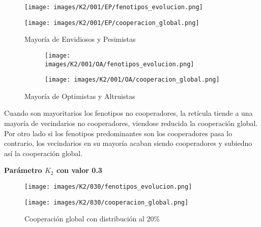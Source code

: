 \documentclass[a4paper,12pt]{report}
\begin{document}
\begin{figure}[h]
    \centering
    \begin{minipage}{0.49\textwidth}
    \centering
    \texttt{[image: images/K2/001/EP/fenotipos\_evolucion.png]}
    \label{fig:enter-label}
    \end{minipage}
    \hfill
    \begin{minipage}{0.49\textwidth}
    \centering
    \texttt{[image: images/K2/001/EP/cooperacion\_global.png]}
    \label{fig:enter-label}
    \end{minipage}
    \caption{Mayoría de Envidiosos y Pesimistas}
\end{figure}
\begin{figure}[h]
    \centering
    \begin{subfigure}[t]{0.49\textwidth}
        \centering
        \texttt{[image: images/K2/001/OA/fenotipos\_evolucion.png]}
        \label{fig:enter-label}
    \end{subfigure}
    \hfill
    \begin{subfigure}[t]{0.49\textwidth}
        \centering
        \texttt{[image: images/K2/001/OA/cooperacion\_global.png]}
        \label{fig:enter-label}
    \end{subfigure}
    \caption{Mayoría de Optimistas y Altruistas}
\end{figure}

\newpage
Cuando son mayoritarios los fenotipos no cooperadores, la retícula tiende a una mayoría de vecindarios no cooperadores, viendose reducida la cooperación global. Por otro lado si los fenotipos predominantes son los cooperadores pasa lo contrario, los vecindarios en su mayoría acaban siendo cooperadores y subiedno así la cooperación global.





\vspace{1.5em}
\noindent\textbf{Parámetro \( K_2 \) con valor 0.3}
\vspace{0.5em}

\begin{figure}[h!]
    \centering
    \begin{minipage}{0.49\textwidth}
    \centering
    \texttt{[image: images/K2/030/fenotipos\_evolucion.png]}
    \label{fig:enter-label}
    \end{minipage}
    \hfill
    \begin{minipage}{0.49\textwidth}
    \centering
    \texttt{[image: images/K2/030/cooperacion\_global.png]}
    \label{fig:enter-label}
    \end{minipage}
    \caption{Cooperación global con distribución al 20\%}
\end{figure}
\end{document}
